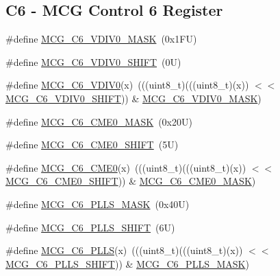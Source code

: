 \subsection*{C6 -\/ M\+CG Control 6 Register}
\begin{DoxyCompactItemize}
\item 
\#define \mbox{\hyperlink{group___m_c_g___register___masks_gacf93ac207865bd372d9148f10dce7267}{M\+C\+G\+\_\+\+C6\+\_\+\+V\+D\+I\+V0\+\_\+\+M\+A\+SK}}~(0x1\+F\+U)
\item 
\#define \mbox{\hyperlink{group___m_c_g___register___masks_ga92208f56fc7ce68a0a8ff14ab5c3b2f6}{M\+C\+G\+\_\+\+C6\+\_\+\+V\+D\+I\+V0\+\_\+\+S\+H\+I\+FT}}~(0\+U)
\item 
\#define \mbox{\hyperlink{group___m_c_g___register___masks_ga50b2068270153c3013b4e0ac2256fbfd}{M\+C\+G\+\_\+\+C6\+\_\+\+V\+D\+I\+V0}}(x)~(((uint8\+\_\+t)(((uint8\+\_\+t)(x)) $<$$<$ \mbox{\hyperlink{group___m_c_g___register___masks_ga92208f56fc7ce68a0a8ff14ab5c3b2f6}{M\+C\+G\+\_\+\+C6\+\_\+\+V\+D\+I\+V0\+\_\+\+S\+H\+I\+FT}})) \& \mbox{\hyperlink{group___m_c_g___register___masks_gacf93ac207865bd372d9148f10dce7267}{M\+C\+G\+\_\+\+C6\+\_\+\+V\+D\+I\+V0\+\_\+\+M\+A\+SK}})
\item 
\#define \mbox{\hyperlink{group___m_c_g___register___masks_ga2e0daa102ec3f225ed9297f7bc9f8239}{M\+C\+G\+\_\+\+C6\+\_\+\+C\+M\+E0\+\_\+\+M\+A\+SK}}~(0x20\+U)
\item 
\#define \mbox{\hyperlink{group___m_c_g___register___masks_ga096e62e71f69f5b749999d671d800090}{M\+C\+G\+\_\+\+C6\+\_\+\+C\+M\+E0\+\_\+\+S\+H\+I\+FT}}~(5\+U)
\item 
\#define \mbox{\hyperlink{group___m_c_g___register___masks_ga70d94d0060b62ceb42672a91ebe51c73}{M\+C\+G\+\_\+\+C6\+\_\+\+C\+M\+E0}}(x)~(((uint8\+\_\+t)(((uint8\+\_\+t)(x)) $<$$<$ \mbox{\hyperlink{group___m_c_g___register___masks_ga096e62e71f69f5b749999d671d800090}{M\+C\+G\+\_\+\+C6\+\_\+\+C\+M\+E0\+\_\+\+S\+H\+I\+FT}})) \& \mbox{\hyperlink{group___m_c_g___register___masks_ga2e0daa102ec3f225ed9297f7bc9f8239}{M\+C\+G\+\_\+\+C6\+\_\+\+C\+M\+E0\+\_\+\+M\+A\+SK}})
\item 
\#define \mbox{\hyperlink{group___m_c_g___register___masks_ga66a1dfdde86a9c165d7bdec17c77578f}{M\+C\+G\+\_\+\+C6\+\_\+\+P\+L\+L\+S\+\_\+\+M\+A\+SK}}~(0x40\+U)
\item 
\#define \mbox{\hyperlink{group___m_c_g___register___masks_ga690a1869788f450cfa53d73f983a1c05}{M\+C\+G\+\_\+\+C6\+\_\+\+P\+L\+L\+S\+\_\+\+S\+H\+I\+FT}}~(6\+U)
\item 
\#define \mbox{\hyperlink{group___m_c_g___register___masks_ga0b971886e3f30b9fecbf46971a45ede3}{M\+C\+G\+\_\+\+C6\+\_\+\+P\+L\+LS}}(x)~(((uint8\+\_\+t)(((uint8\+\_\+t)(x)) $<$$<$ \mbox{\hyperlink{group___m_c_g___register___masks_ga690a1869788f450cfa53d73f983a1c05}{M\+C\+G\+\_\+\+C6\+\_\+\+P\+L\+L\+S\+\_\+\+S\+H\+I\+FT}})) \& \mbox{\hyperlink{group___m_c_g___register___masks_ga66a1dfdde86a9c165d7bdec17c77578f}{M\+C\+G\+\_\+\+C6\+\_\+\+P\+L\+L\+S\+\_\+\+M\+A\+SK}})
$$
\end{DoxyCompactItemize}

